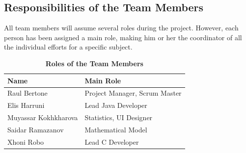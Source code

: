 \documentclass[conference,12pt]{IEEETran}
\begin{document}
\subsection{Responsibilities of the Team Members}

All team members will assume several roles during the project. However, each person has been assigned a main role, making him or her the coordinator of all the individual efforts for a specific subject. 
\FloatBarrier
\begin{table}[h]
	\centering
	\caption{\textbf{Roles of the Team Members}}
	{\renewcommand{\arraystretch}{2}%
		\begin{tabular}{ | l | l | }
			\hline
			\textbf{Name} & \textbf{Main Role} \\ \hline
			Raul Bertone & Project Manager, Scrum Master \\ \hline
			Elis Harruni & Lead Java Developer \\ \hline
			Muyassar Kokhkharova & Statistics, UI Designer \\ \hline
			Saidar Ramazanov & Mathematical Model \\ \hline
			Xhoni Robo & Lead C Developer \\ \hline
	\end{tabular}}
\end{table} 


\FloatBarrier
\end{document}
